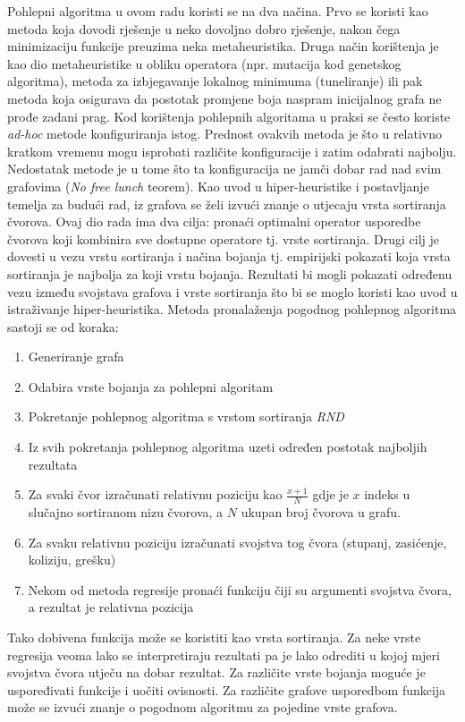 \documentclass[times, utf8, diplomski, numeric]{fer}
\begin{document}
Pohlepni algoritma u ovom radu koristi se na dva načina. Prvo se koristi kao metoda koja dovodi rješenje u neko dovoljno dobro rješenje, nakon čega minimizaciju funkcije preuzima neka metaheuristika. Druga način korištenja je kao dio metaheuristike u obliku operatora (npr. mutacija kod genetskog algoritma), metoda za izbjegavanje lokalnog minimuma (tuneliranje) ili pak metoda koja osigurava da postotak promjene boja naspram inicijalnog grafa ne prođe zadani prag. Kod korištenja pohlepnih algoritama u praksi se često koriste \emph{ad-hoc} metode konfiguriranja istog. Prednost ovakvih metoda je što u relativno kratkom vremenu mogu isprobati različite konfiguracije i zatim odabrati najbolju. Nedostatak metode je u tome što ta konfiguracija ne jamči dobar rad nad svim grafovima (\emph{No free lunch} teorem). Kao uvod u hiper-heuristike i postavljanje temelja za budući rad, iz grafova se želi izvući znanje o utjecaju vrsta sortiranja čvorova. Ovaj dio rada ima dva cilja: pronaći optimalni operator usporedbe čvorova koji kombinira sve dostupne operatore tj. vrste sortiranja. Drugi cilj je dovesti u vezu vrstu sortiranja i načina bojanja tj. empirijski pokazati koja vrsta sortiranja je najbolja za koji vrstu bojanja. Rezultati bi mogli pokazati određenu vezu između svojstava grafova i vrste sortiranja što bi se moglo koristi kao uvod u istraživanje hiper-heuristika. Metoda pronalaženja pogodnog pohlepnog algoritma sastoji se od koraka:

\begin{enumerate}
	\item Generiranje grafa
	\item Odabira vrste bojanja za pohlepni algoritam
	\item Pokretanje pohlepnog algoritma s vrstom sortiranja \emph{RND}
	\item Iz svih pokretanja pohlepnog algoritma uzeti određen postotak najboljih rezultata
	\item Za svaki čvor izračunati relativnu poziciju kao $\frac{x+1}{N}$ gdje je $x$ indeks u slučajno sortiranom nizu čvorova, a $N$ ukupan broj čvorova u grafu. 
	\item Za svaku relativnu poziciju izračunati svojstva tog čvora (stupanj, zasićenje, koliziju, grešku)
	\item Nekom od metoda regresije pronaći funkciju čiji su argumenti svojstva čvora, a rezultat je relativna pozicija
\end{enumerate}

Tako dobivena funkcija može se koristiti kao vrsta sortiranja. Za neke vrste regresija veoma lako se interpretiraju rezultati pa je lako odrediti u kojoj mjeri svojstva čvora utječu na dobar rezultat. Za različite vrste bojanja moguće je uspoređivati funkcije i uočiti ovisnosti. Za različite grafove usporedbom funkcija može se izvući znanje o pogodnom algoritmu za pojedine vrste grafova. 
\end{document}
